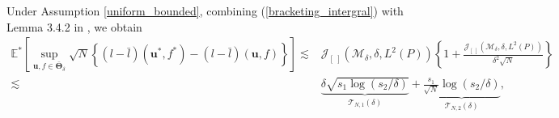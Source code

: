 \documentclass[
  12pt]{article}
\begin{document}
Under Assumption \ref{uniform_bounded}, combining (\ref{bracketing_intergral}) with Lemma 3.4.2 in \cite{van1996weak}, we obtain %
{\small\begin{align}
\mathbb{E}^*\left[\sup _{\boldsymbol{u},f \in \bar{\boldsymbol{\Theta}}_\delta} \sqrt{N}\left\{(l-\bar{l})(\boldsymbol{u}^*,f^*)-(l-\bar{l})(\boldsymbol{u},f)\right\}\right] \lesssim &\mathcal{J}_{[\ ]}\left(\mathcal{M}_{\delta},\delta,L^2(P)\right)\left\{1+\frac{\mathcal{J}_{[\ ]}\left(\mathcal{M}_{\delta},\delta,L^2(P)\right)}{\delta^2 \sqrt{N}}\right\} \nonumber\\
\lesssim& \underbrace{\delta \sqrt{s_1 \log \left(s_2 / \delta\right)}}_{\mathcal{T}_{N,1}(\delta)} + \underbrace{\frac{s_1}{\sqrt{N}} \log \left(s_2 / \delta\right)}_{\mathcal{T}_{N,2}(\delta)}, \label{wellinger_bound}
\end{align}}
\end{document}
